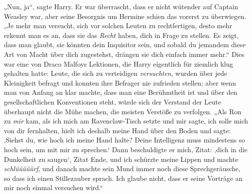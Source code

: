 „Nun, ja“, sagte Harry. Er war überrascht, dass er nicht wütender auf Captain Weasley war, aber seine Besorgnis um Hermine schien das vorerst zu überwiegen.
„Je mehr man versucht, sich vor solchen Leuten zu rechtfertigen, desto mehr erkennt man es an, dass sie das \emph{Recht} haben, dich in Frage zu stellen. Es zeigt, dass man glaubt, sie könnten dein Inquisitor sein, und sobald du jemandem diese Art von Macht über dich zugestehst, drängen sie dich einfach immer mehr.“ Dies war eine von Draco Malfoys Lektionen, die Harry eigentlich für ziemlich klug gehalten hatte: Leute, die sich zu verteidigen \emph{versuchten}, wurden über jede Kleinigkeit befragt und konnten ihre Befrager nie zufrieden stellen; aber wenn man von Anfang an klar machte, dass man eine Berühmtheit ist und über den gesellschaftlichen Konventionen steht, würde sich der Verstand der Leute überhaupt nicht die Mühe machen, die meisten Verstöße zu verfolgen.
„Als Ron zu \emph{mir} kam, als ich mich am Ravenclaw-Tisch setzte und mir sagte, ich solle mich von dir fernhalten, hielt ich deshalb meine Hand über den Boden und sagte: ‚Siehst du, wie hoch ich meine Hand halte? Deine Intelligenz muss mindestens so hoch sein, um mit mir zu sprechen.‘ Dann beschuldigte er mich, Zitat: ‚dich in die Dunkelheit zu saugen‘, Zitat Ende, und ich schürzte meine Lippen und machte \emph{schlüüüüürf}, und danach machte sein Mund immer noch diese Sprechgeräusche, so dass ich einen Stillezauber sprach. Ich glaube nicht, dass er seine Vorträge an mir noch einmal versuchen wird.“

